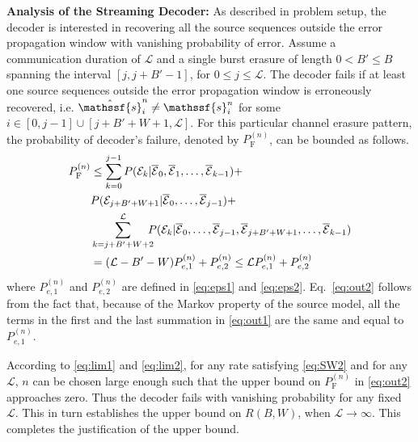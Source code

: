 \documentclass[journal, twocolumn, 10pt]{IEEEtran}
\newcommand{\rvs}{{\mathssf{s}}}    %
\begin{document}
{\bf Analysis of the Streaming Decoder:} As described in problem setup, the decoder is interested in recovering all the source sequences outside the error propagation window with vanishing probability of error. Assume a communication duration of $\mathcal{L}$ and a single burst erasure of length $0<B'\le B$ spanning the interval $[j, j+B'-1]$, for $0\le j\le \mathcal{L}$. The decoder fails if at least one source sequences outside the error propagation window is erroneously recovered, i.e. $\hat{\rvs}^n_{i} \neq \rvs^n_{i}$ for some $i\in [0,j-1]\cup[j+B'+W+1,\mathcal{L}]$. For this particular channel erasure pattern, the probability of decoder's failure, denoted by $P^{(n)}_{\textrm{F}}$, can be bounded  as follows.  
\begin{align}
P^{(n)}_{\textrm{F}} &\le  \sum_{k=0}^{j-1}P(\mathcal{E}_{k} | \overline{\mathcal{E}}_{0}, \overline{\mathcal{E}}_{1}, \ldots ,\overline{\mathcal{E}}_{k-1}) +\notag\\ & P(\mathcal{E}_{j+B'+W+1} | \overline{\mathcal{E}}_{0}, \ldots,\overline{\mathcal{E}}_{j-1}) +\notag\\
&  \sum_{k=j+B'+W+2}^{\mathcal{L}}\!\!\!\! P(\mathcal{E}_{k}| \overline{\mathcal{E}}_{0}, \ldots, \overline{\mathcal{E}}_{j-1}, \overline{\mathcal{E}}_{j+B'+W+1}, \ldots,\overline{\mathcal{E}}_{k-1} ) \label{eq:out1}\\
& = (\mathcal{L}-B'-W) P^{(n)}_{e,1} + P^{(n)}_{e,2}\le \mathcal{L}  P^{(n)}_{e,1} + P^{(n)}_{e,2}\label{eq:out2}
\end{align} where  $P^{(n)}_{e,1}$ and $P^{(n)}_{e,2}$ are defined in \eqref{eq:eps1} and \eqref{eq:eps2}. Eq.~\eqref{eq:out2} follows from the fact that, because of the Markov property of the source model, all the terms in the first and the last summation in \eqref{eq:out1} are the same and equal to $P_{e,1}^{(n)}$. 

According to \eqref{eq:lim1} and \eqref{eq:lim2}, for any rate satisfying \eqref{eq:SW2} and for any $\mathcal{L}$, $n$ can be chosen large enough such that the upper bound on $P^{(n)}_{\textrm{F}}$ in \eqref{eq:out2} approaches zero. Thus the decoder fails with vanishing probability for any fixed $\mathcal{L}$. This in turn establishes the upper bound on $R(B,W)$, when ${\mathcal L} \rightarrow\infty$.
This completes the justification of the upper bound.
\end{document}
